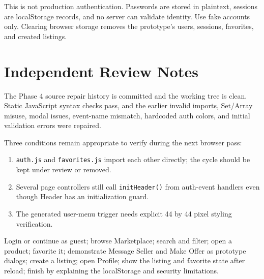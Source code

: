 \documentclass[10pt]{article}
\newcommand{\code}[1]{\texttt{#1}}
\begin{document}
\begin{warningbox}
\small
This is not production authentication. Passwords are stored in plaintext, sessions are localStorage records, and no server can validate identity. Use fake accounts only. Clearing browser storage removes the prototype's users, sessions, favorites, and created listings.
\end{warningbox}

\section{Independent Review Notes}

The Phase 4 source repair history is committed and the working tree is clean. Static JavaScript syntax checks pass, and the earlier invalid imports, Set/Array misuse, modal issues, event-name mismatch, hardcoded auth colors, and initial validation errors were repaired.

Three conditions remain appropriate to verify during the next browser pass:

\begin{enumerate}
  \setlength{\itemsep}{1pt}
  \item \code{auth.js} and \code{favorites.js} import each other directly; the cycle should be kept under review or removed.
  \item Several page controllers still call \code{initHeader()} from auth-event handlers even though Header has an initialization guard.
  \item The generated user-menu trigger needs explicit 44 by 44 pixel styling verification.
\end{enumerate}

\begin{tcolorbox}[colback=lavender,colframe=violet,title=Suggested Live Demonstration Order,fonttitle=\bfseries,coltitle=darktext,boxrule=0.8pt]
\small
Login or continue as guest; browse Marketplace; search and filter; open a product; favorite it; demonstrate Message Seller and Make Offer as prototype dialogs; create a listing; open Profile; show the listing and favorite state after reload; finish by explaining the localStorage and security limitations.
\end{tcolorbox}
\end{document}
